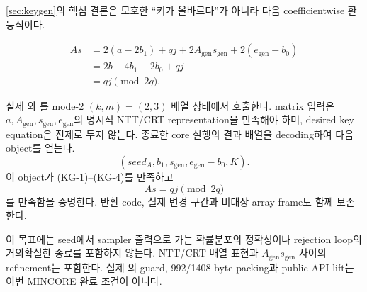 \cref{sec:keygen}의 핵심 결론은 모호한 ``키가 올바르다''가 아니라 다음
coefficientwise 환 등식이다.

\begin{align*}
As
 &=2(a-2b_1)+qj
   +2A_{\mathrm{gen}}s_{\mathrm{gen}}
   +2(e_{\mathrm{gen}}-b_0)\\
 &=2b-4b_1-2b_0+qj\\
 &=qj\pmod{2q}.
\end{align*}

\begin{verificationgoal}
실제 와 를 mode-2
\((k,m)=(2,3)\) 배열 상태에서 호출한다. matrix 입력은
\(a,A_{\mathrm{gen}},s_{\mathrm{gen}},e_{\mathrm{gen}}\)의 명시적
NTT/CRT representation을 만족해야 하며, desired key equation은 전제로 두지
않는다. 종료한 core 실행의 결과 배열을 decoding하여 다음 object를 얻는다.
\[
  (seed_A,b_1,s_{\mathrm{gen}},e_{\mathrm{gen}}-b_0,K).
\]
이 object가
\textup{(KG-1)}--\textup{(KG-4)}를 만족하고
\[
  As=qj\pmod{2q}
\]
를 만족함을 증명한다. 반환 code, 실제 변경 구간과 비대상 array frame도 함께
보존한다.
\end{verificationgoal}

이 목표에는 seed에서 sampler 출력으로 가는 확률분포의 정확성이나 rejection
loop의 거의확실한 종료를 포함하지 않는다. NTT/CRT 배열 표현과
\(A_{\mathrm{gen}}s_{\mathrm{gen}}\) 사이의 refinement는 포함한다. 실제
의 guard, 992/1408-byte packing과 public API lift는
이번 MINCORE 완료 조건이 아니다.
